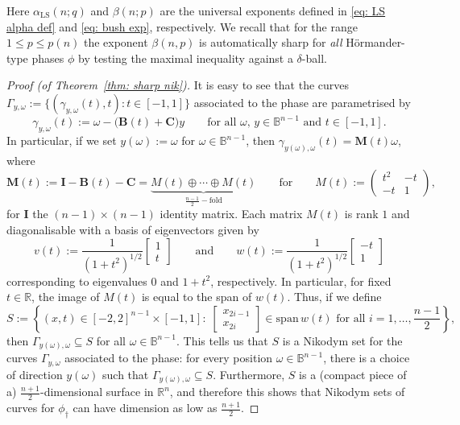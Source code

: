 \documentclass[reqno]{amsart}
\numberwithin{equation}{section}
\newcommand{\B}{\mathbb{B}}
\newcommand{\R}{\mathbb{R}}
\newcommand{\bB}{\mathbf{B}}
\newcommand{\bC}{\mathbf{C}}
\newcommand{\bI}{\mathbf{I}}
\newcommand{\bM}{\mathbf{M}}
\theoremstyle{plain}
\theoremstyle{definition}
\begin{document}
Here $\alpha_{\mathrm{LS}}(n;q)$ and $\beta(n; p)$ are the universal exponents defined in \eqref{eq: LS alpha def} and \eqref{eq: bush exp}, respectively. We recall that for the range $1 \leq p \leq p(n)$ the exponent $\beta(n,p)$ is automatically sharp for \textit{all} H\"ormander-type phases $\phi$ by testing the maximal inequality against a $\delta$-ball. 

\begin{proof}[Proof (of Theorem~\ref{thm: sharp nik})] It is easy to see that the curves $\Gamma_{y, \omega} := \{(\gamma_{y, \omega}(t), t) : t \in [-1,1]\}$ associated to the phase are parametrised by
\begin{equation*}
    \gamma_{y, \omega}(t) := \omega - \big(\bB(t) + \bC)y \qquad \textrm{for all $\omega$, $y \in \B^{n-1}$ and $t \in [-1,1]$.}
\end{equation*}
In particular, if we set $y(\omega) := \omega$ for $\omega \in \B^{n-1}$, then $\gamma_{y(\omega), \omega}(t) = \bM(t) \omega$, where
\begin{equation*}
     \bM(t) := \bI - \bB(t) - \bC = \underbrace{M(t) \oplus \cdots \oplus M(t)}_{\frac{n-1}{2}-\textrm{fold}} \qquad \textrm{for} \qquad M(t):=
\begin{pmatrix}
t^2 &-t
\\
-t &1
\end{pmatrix},
\end{equation*}
for $\bI$ the $(n-1) \times (n-1)$ identity matrix. Each matrix $M(t)$ is rank $1$ and diagonalisable with a basis of eigenvectors given by 
\begin{equation*}
    v(t) := \frac{1}{(1+ t^2)^{1/2}}
    \begin{bmatrix}
        1 \\
        t
    \end{bmatrix}
    \qquad \textrm{and} \qquad
w(t) := \frac{1}{(1+ t^2)^{1/2}}
    \begin{bmatrix}
       -t \\
        1
    \end{bmatrix}
\end{equation*}
corresponding to eigenvalues $0$ and $1 + t^2$, respectively. In particular, for fixed $t \in \R$, the image of $M(t)$ is equal to the span of $w(t)$. Thus, if we define
\begin{equation*}
S:=\left\{(x,t) \in [-2,2]^{n-1} \times [-1,1]:\;\begin{bmatrix}
    x_{2i-1} \\
    x_{2i}
\end{bmatrix}
\in \mathrm{span}\,w(t) \text{ for all }i=1,\ldots,\frac{n-1}{2}\right\},
\end{equation*}
then $\Gamma_{y(\omega), \omega} \subseteq S$ for all $\omega \in \B^{n-1}$. This tells us that $S$ is a Nikodym set for the curves $\Gamma_{y, \omega}$ associated to the phase: for every position $\omega \in \B^{n-1}$, there is a choice of direction $y(\omega)$ such that $\Gamma_{y(\omega), \omega} \subseteq S$. Furthermore, $S$ is a (compact piece of a) $\frac{n+1}{2}$-dimensional surface in $\R^n$, and therefore this shows that Nikodym sets of curves for $\phi_{\dagger}$ can have dimension as low as $\frac{n+1}{2}$. 
 

\end{proof}
\end{document}
